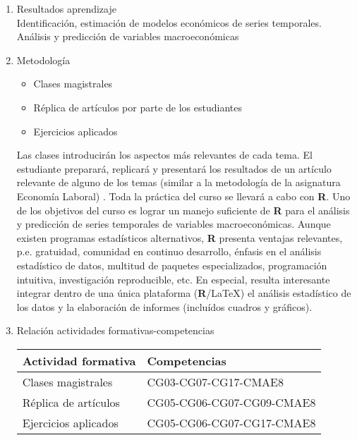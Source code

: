 \documentclass{article}\usepackage[]{graphicx}\usepackage[]{color}
\begin{document}
\begin{enumerate}
  \item Resultados aprendizaje\\
        Identificación, estimación de modelos económicos de series temporales.\\
        Análisis y predicción de variables macroeconómicas

      \item Metodología\\
        \begin{itemize}
          \item Clases magistrales
          \item Réplica de artículos por parte de los estudiantes
          \item Ejercicios aplicados
        \end{itemize}

   Las clases introducirán los aspectos más relevantes de cada tema. El estudiante preparará, replicará y presentará los resultados de un artículo relevante de alguno de los temas (similar a la metodología de la asignatura Economía Laboral) . Toda la práctica del curso se llevará a cabo con \textbf{\textsf{R}}. Uno de los objetivos del curso es lograr un manejo suficiente de \textbf{\textsf{R}} para el análisis y predicción de series temporales de variables macroeconómicas. Aunque existen programas estadísticos alternativos, \textbf{\textsf{R}} presenta ventajas relevantes, p.e. gratuidad, comunidad en continuo desarrollo, énfasis en el análisis estadístico de datos, multitud de paquetes especializados, programación intuitiva, investigación reproducible, etc. En especial, resulta interesante integrar dentro de una única plataforma (\textbf{\textsf{R}}/{\LaTeX}) el análisis estadístico de los datos y la elaboración de informes (incluídos cuadros y gráficos).

  \item Relación actividades formativas-competencias
  \begin{center}
  \begin{tabular}{ l  l }
    \hline
    Actividad formativa &Competencias\\ \hline
    Clases magistrales &CG03-CG07-CG17-CMAE8\\
    Réplica de artículos &CG05-CG06-CG07-CG09-CMAE8\\
    Ejercicios aplicados &CG05-CG06-CG07-CG17-CMAE8\\ \hline
  \end{tabular}
\end{center}
      

\end{enumerate}
\end{document}
